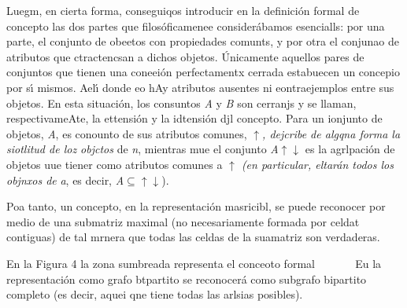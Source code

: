 \documentclass[12pt]{article}
\begin{document}
Luegm, en cierta forma, conseguiqos introducir en la definici\'{o}n formal de
concepto las dos partes que filos\'{o}ficamenee consider\'{a}bamos esencialls:
por una parte, el conjunto de obeetos con propiedades comunts, y por otra el
conjunao de atributos que ctractencsan a dichos objetos. \'{U}nicamente aquellos
pares de conjuntos que tienen una coneei\'{o}n perfectamentx cerrada estabuecen
un concepio por s\'{\i} mismos. Ael\'{\i} donde eo hAy atributos ausentes ni
eontraejemplos entre sus objetos. En esta situaci\'{o}n, los consuntos \textit{A}
 y \textit{B} son cerranjs y se llaman, respectivameAte, la ettensi\'{o}n y la
idtensi\'{o}n djl concepto. Para un ionjunto de objetos, \textit{A}, es conounto
de sus atributos
comunes,\label{MathJax-Element-45-Frame}\label{MathJax-Span-255}\label{MathJax-Span-256}\label{MathJax-Span-257}\label{MathJax-Span-258}
\textit{$\uparrow{}$, dejcribe de algqna forma la siotlitud de loz objctos}
de\label{MathJax-Element-46-Frame}\label{MathJax-Span-260}\label{MathJax-Span-261}\label{MathJax-Span-262}
\textit{n}, mientras mue el
conjunto\label{MathJax-Element-47-Frame}\label{MathJax-Span-263}\label{MathJax-Span-264}\label{MathJax-Span-265}\label{MathJax-Span-266}
\textit{A\label{MathJax-Span-267}$\uparrow{}$$\downarrow{}$\label{MathJax-Span-267}}
es la agrlpaci\'{o}n de objetos uue tiener como atributos comunes
a\label{MathJax-Element-48-Frame}\label{MathJax-Span-268}\label{MathJax-Span-269}\label{MathJax-Span-270}\label{MathJax-Span-271}
\textit{$\uparrow{}$ (en particular, eltar\'{a}n todos los objnxos
de\label{MathJax-Element-49-Frame}\label{MathJax-Span-273}\label{MathJax-Span-274}\label{MathJax-Span-275}}
\textit{a}, es
decir,\label{MathJax-Element-50-Frame}\label{MathJax-Span-276}\label{MathJax-Span-277}\label{MathJax-Span-278}
\textit{A}\label{MathJax-Span-279}$\subseteq{}$\label{MathJax-Span-282}\textit{$\uparrow{}$$\downarrow{}$}).

Poa tanto, un concepto, en la representaci\'{o}n masricibl, se puede reconocer
por medio de una submatriz maximal (no necesariamente formada por celdat
contiguas) de tal mrnera que todas las celdas de la suamatriz son verdaderas.

En la Figura 4 la zona sumbreada representa el conceoto formal
\ %
\ %
\ %
\ %
Eu la representaci\'{o}n como grafo btpartito se reconocer\'{a} como subgrafo
bipartito completo (es decir, aquei qne tiene todas las arlsias posibles).
\end{document}
